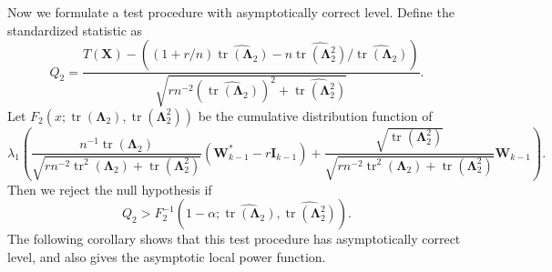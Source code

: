 \documentclass[12pt]{article} %
\DeclareMathOperator{\mytr}{tr}
\newcommand{\bX}{\mathbf{X}}
\newcommand{\bI}{\mathbf{I}}
\newcommand{\bW}{\mathbf{W}}
\newcommand{\bfsym}[1]{\ensuremath{\boldsymbol{#1}}}
\def\bLambda {\bfsym {\Lambda}}
\theoremstyle{definition}
\begin{document}
Now we formulate a test procedure with asymptotically correct level.
Define the standardized statistic as
\begin{equation*}
    Q_2=
\frac{
    T(\bX)
    -
    \left((1+r/n)\widehat{\mytr(\bLambda_2)}-n\widehat{\mytr(\bLambda_2^2)}/\widehat{\mytr(\bLambda_2)}\right)
}{
    \sqrt{
        rn^{-2}(\widehat{\mytr(\bLambda_2)})^2+ 
        \widehat{\mytr(\bLambda_2^2)}
    }
}.
\end{equation*}
Let $
F_2(x;\mytr(\bLambda_2),\mytr(\bLambda_2^2))
$ be the cumulative distribution function of
\begin{equation*}
\lambda_1
\left(
\frac{
    n^{-1} \mytr(\bLambda_2)
}{
    \sqrt{
        rn^{-2} \mytr^2 (\bLambda_2) + \mytr(\bLambda_2^2)
    }
}
(\bW_{k-1}^* - r\bI_{k-1})
+
\frac{
    \sqrt{\mytr(\bLambda_2^2)}
}{
    \sqrt{
        rn^{-2} \mytr^2 (\bLambda_2) + \mytr(\bLambda_2^2)
    }
}
\bW_{k-1}
\right).
\end{equation*}
Then we reject the null hypothesis if
\begin{equation*}
    Q_2
    >
    F_2^{-1}\left(1-\alpha;\widehat{\mytr(\bLambda_2)},\widehat{\mytr(\bLambda_2^2)}\right).
\end{equation*}
The following corollary shows that this test procedure has asymptotically correct level, and also gives the asymptotic local power function.
\end{document}
